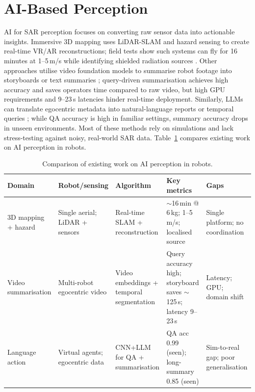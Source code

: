 \section{AI-Based Perception}
\label{sec:lit_ai}

AI for SAR perception focuses on converting raw sensor data into actionable insights. Immersive 3D mapping uses LiDAR-SLAM and hazard sensing to create real-time VR/AR reconstructions; field tests show such systems can fly for 16 minutes at 1--5\,m/s while identifying shielded radiation sources \cite{dayani2021}. Other approaches utilise video foundation models to summarise robot footage into storyboards or text summaries \cite{video2023}; query-driven summarisation achieves high accuracy and saves operators time compared to raw video, but high GPU requirements and 9--23\,s latencies hinder real-time deployment. Similarly, LLMs can translate egocentric metadata into natural-language reports or temporal queries \cite{dechant2023}; while QA accuracy is high in familiar settings, summary accuracy drops in unseen environments. Most of these methods rely on simulations and lack stress-testing against noisy, real-world SAR data. Table~\ref{tab:ai_compare} compares existing work on AI perception in robots.

\begin{table}[htbp]
\caption{Comparison of existing work on AI perception in robots.}
\label{tab:ai_compare}
\centering
\small
\begin{tabular}{p{2.2cm}p{2cm}p{2cm}p{2.2cm}p{2.2cm}}
\toprule
\textbf{Domain} & \textbf{Robot/sensing} & \textbf{Algorithm} & \textbf{Key metrics} & \textbf{Gaps} \\
\midrule
3D mapping + hazard \cite{dayani2021} & Single aerial; LiDAR + sensors & Real-time SLAM + reconstruction & $\sim$16\,min @ 6\,kg; 1--5\,m/s; localised source & Single platform; no coordination \\
Video summarisation \cite{video2023} & Multi-robot egocentric video & Video embeddings + temporal segmentation & Query accuracy high; storyboard saves $\sim$125\,s; latency 9--23\,s & Latency; GPU; domain shift \\
Language action \cite{dechant2023} & Virtual agents; egocentric data & CNN+LLM for QA + summarisation & QA acc 0.99 (seen); long-summary 0.85 (seen) & Sim-to-real gap; poor generalisation \\
\bottomrule
\end{tabular}
\end{table}

